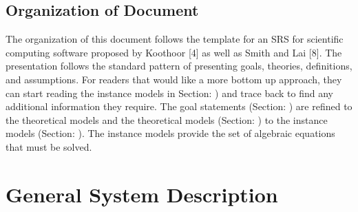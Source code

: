 \documentclass[12pt]{article}
\begin{document}

\subsection{Organization of Document}

The organization of this document follows the template for an SRS for scientific computing
software proposed by Koothoor [4] as well as Smith and Lai [8]. The presentation follows
the standard pattern of presenting goals, theories, definitions, and assumptions. For readers
that would like a more bottom up approach, they can start reading the instance models in
Section:  ) and trace back to find any additional information they require.
The goal statements (Section:  ) are refined to the theoretical models
and the theoretical models (Section:  ) to the instance models (Section:  ). The instance models provide the set of algebraic equations that must be
solved.

\section{General System Description}
\end{document}
